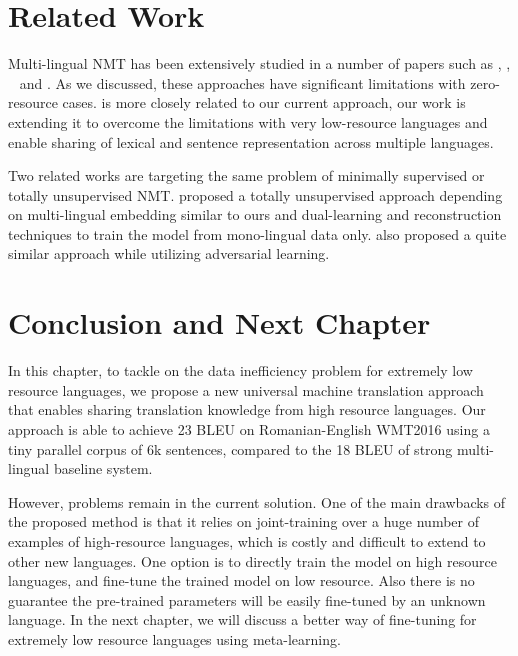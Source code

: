 \section{Related Work} 
Multi-lingual NMT has been extensively studied in a number of papers such as  , , ~ and . As we discussed, these approaches have significant limitations with zero-resource cases.  is more closely related to our current approach, our work is extending  it  to overcome the  limitations with very low-resource languages and enable sharing of  lexical and sentence representation across multiple languages. 

Two related works are targeting the same problem of  minimally supervised  or totally unsupervised NMT.  proposed a totally unsupervised approach depending on multi-lingual embedding similar to ours and dual-learning and reconstruction techniques to train the model from mono-lingual data only.  also proposed a quite similar approach while utilizing adversarial learning.   

\section{Conclusion and Next Chapter}
 In this chapter, to tackle on the data inefficiency problem for extremely low resource languages, we propose a new  universal machine translation approach that enables sharing translation knowledge from high resource languages.  Our approach is able to achieve 23 BLEU on Romanian-English WMT2016 using a tiny parallel corpus of 6k sentences, compared to the 18 BLEU of strong multi-lingual baseline system. 
 
 However, problems remain in the current solution. One of the main drawbacks of the proposed method is that it relies on joint-training over a huge number of examples of high-resource languages, which is costly and difficult to extend to other new languages. One option is to directly train the model on high resource languages, and fine-tune the trained model on low resource. Also there is no guarantee the pre-trained parameters will be easily fine-tuned by an unknown language. 
 In the next chapter, we will discuss a better way of fine-tuning for extremely low resource languages using meta-learning.
 
 
 